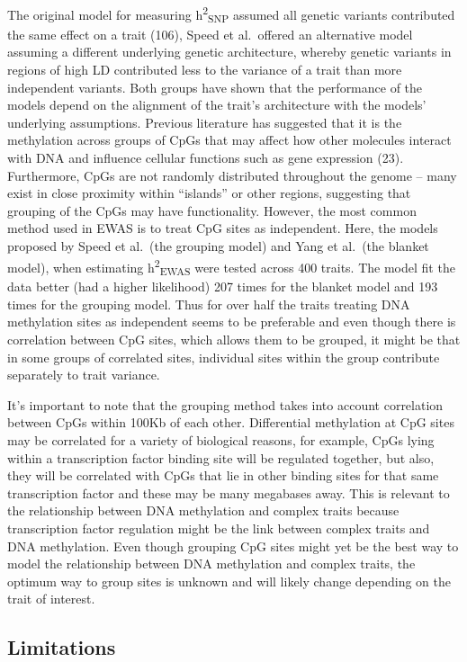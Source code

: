 \documentclass[11pt,oneside]{bristolthesis}
\begin{document}
The original model for measuring h\textsuperscript{2}\textsubscript{SNP} assumed all genetic variants contributed the same effect on a trait (106), Speed et al.~offered an alternative model assuming a different underlying genetic architecture, whereby genetic variants in regions of high LD contributed less to the variance of a trait than more independent variants. Both groups have shown that the performance of the models depend on the alignment of the trait's architecture with the models' underlying assumptions. Previous literature has suggested that it is the methylation across groups of CpGs that may affect how other molecules interact with DNA and influence cellular functions such as gene expression (23). Furthermore, CpGs are not randomly distributed throughout the genome -- many exist in close proximity within ``islands'' or other regions, suggesting that grouping of the CpGs may have functionality. However, the most common method used in EWAS is to treat CpG sites as independent. Here, the models proposed by Speed et al.~(the grouping model) and Yang et al.~(the blanket model), when estimating h\textsuperscript{2}\textsubscript{EWAS} were tested across 400 traits. The model fit the data better (had a higher likelihood) 207 times for the blanket model and 193 times for the grouping model. Thus for over half the traits treating DNA methylation sites as independent seems to be preferable and even though there is correlation between CpG sites, which allows them to be grouped, it might be that in some groups of correlated sites, individual sites within the group contribute separately to trait variance.

It's important to note that the grouping method takes into account correlation between CpGs within 100Kb of each other. Differential methylation at CpG sites may be correlated for a variety of biological reasons, for example, CpGs lying within a transcription factor binding site will be regulated together, but also, they will be correlated with CpGs that lie in other binding sites for that same transcription factor and these may be many megabases away. This is relevant to the relationship between DNA methylation and complex traits because transcription factor regulation might be the link between complex traits and DNA methylation. Even though grouping CpG sites might yet be the best way to model the relationship between DNA methylation and complex traits, the optimum way to group sites is unknown and will likely change depending on the trait of interest.

\hypertarget{limitations-05}{%
\subsection{Limitations}\label{limitations-05}}
\end{document}
